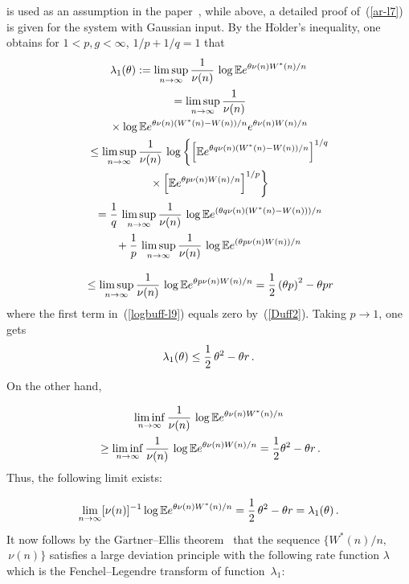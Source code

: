 \begin{multicols}{2}
\begin{equation}
\label{ar-l7}
\end{equation}
 is used  as  an assumption  in  the  paper~\cite{Duffield},
while  above,  a detailed proof of~(\ref{ar-l7}) is given for the system with
Gaussian input.  By the H$\ddot{\mbox{o}}$lder's inequality,  one obtains for
$1<p,g<\infty$, ${1}/{p}+{1}/{q}=1$ that
\begin{multline}
\lambda_1(\theta) := \limsup\limits_{n \to \infty } \displaystyle\frac{\displaystyle 1\mathstrut}{\displaystyle \nu(n)\mathstrut}\,
\log \mathbb E e^{\theta \nu(n) W^*(n)/n}\\
{}= \limsup\limits_{n \to \infty}\displaystyle\frac{\displaystyle 1\mathstrut}{\displaystyle \nu(n)\mathstrut}\\
{}\times \log \mathbb E e^{\theta
 \nu(n)(W^*(n)-W(n))/n}e^{\theta \nu(n) W(n)/n}
\\
{}\leq \limsup\limits_{n \to \infty} \displaystyle\frac{\displaystyle 1\mathstrut}{\displaystyle \nu(n)\mathstrut}\,\log \left\{ \left[ \mathbb E
e^{\theta q \nu(n) (W^*(n)-W(n))/n} \right]^{1/q}\right.\\
\left.{}\times \left[ \mathbb E
e^{\theta p \nu(n) W(n)/n } \right]^{1/p} \right\}\\
{}= \displaystyle\frac{\displaystyle 1\mathstrut}{\displaystyle q\mathstrut}\,\limsup\limits_{n \to \infty} \displaystyle\frac{\displaystyle 1\mathstrut}{\displaystyle \nu(n)\mathstrut}\,\log \mathbb E
e^{(\theta q\nu(n) \left(W^*(n)-W(n)\right))/n}\\
{}+
\displaystyle\frac{\displaystyle 1\mathstrut}{\displaystyle p\mathstrut}\,\limsup\limits_{n \to \infty} \displaystyle\frac{\displaystyle 1\mathstrut}{\displaystyle \nu(n)\mathstrut}\, \log
\mathbb E e^{(\theta p \nu(n) W(n))/n}
\label{logbuff-l9}
\end{multline}

\vspace*{-12pt}

\noindent
\begin{equation*}
{}\leq \limsup\limits_{n \to \infty}\displaystyle\frac{\displaystyle 1\mathstrut}{\displaystyle \nu(n)\mathstrut} \,\log \mathbb E
e^{\theta p \nu(n) W(n)/n}=\displaystyle\frac{\displaystyle 1\mathstrut}{\displaystyle 2\mathstrut}\left(\theta p\right)^2 - \theta p r
\label{logbuff-l10}
\end{equation*}
where  the first term in~(\ref{logbuff-l9}) equals zero
by~(\ref{Duff2}). Taking $p \to 1$, one gets
$$
\lambda_1(\theta)\leq \displaystyle\frac{\displaystyle 1\mathstrut}{\displaystyle 2\mathstrut}\,\theta^2 - \theta r\,.
$$
On the other  hand,

\noindent
\begin{multline*}
\liminf\limits_{n \to \infty} \displaystyle\frac{\displaystyle 1\mathstrut}{\displaystyle \nu(n)\mathstrut}\, \log \mathbb E e^{\theta \nu(n)
W^*(n)/n} \\
{}\geq \liminf\limits_{n \to \infty}\displaystyle\frac{\displaystyle 1\mathstrut}{\displaystyle \nu(n)\mathstrut}\, \log \mathbb E
e^{\theta \nu(n) W(n)/n}=\displaystyle\frac{\displaystyle 1\mathstrut}{\displaystyle 2\mathstrut}\theta^2 - \theta r\,.
\end{multline*}
Thus, the following limit exists:

\noindent
$$
\lim\limits_{n \to \infty} [\nu(n)]^{-1} \log \mathbb E e^{\theta \nu(n)
W^*(n)/n}=\displaystyle\frac{\displaystyle 1\mathstrut}{\displaystyle 2\mathstrut}\,\theta^2 - \theta r=\lambda_1(\theta)\,.
$$
It now follows  by the G$\ddot{\mbox{a}}$rtner--Ellis theorem~\cite {Dembo}
that the sequence  $\{W^*(n)/n,$ $\, \nu(n)\}$  satisfies a large
deviation principle with the following rate function $\lambda$ which
is   the Fenchel--Legendre transform of function~$\lambda_1$:


\end{multicols}
